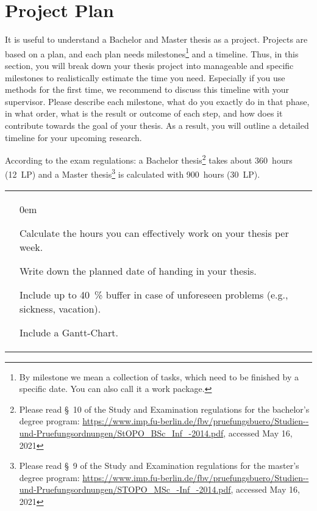 \section{Project Plan}
\label{sec:plan}

It is useful to understand a Bachelor and Master thesis as a project. Projects are based on a plan, and each plan needs milestones\footnote{By milestone we mean a collection of tasks, which need to be finished by a specific date. You can also call it a work package.} and a timeline. Thus, in this section, you will break down your thesis project into manageable and specific milestones to realistically estimate the time you need. Especially if you use methods for the first time, we recommend to discuss this timeline with your supervisor. Please describe each milestone, what do you exactly do in that phase, in what order, what is the result or outcome of each step, and how does it contribute towards the goal of your thesis. As a result, you will outline a detailed timeline for your upcoming research.

According to the exam regulations: a Bachelor thesis\footnote{Please read \S~10 of the Study and Examination regulations for the bachelor’s degree program: \url{https://www.imp.fu-berlin.de/fbv/pruefungsbuero/Studien--und-Pruefungsordnungen/StOPO_BSc_Inf_-2014.pdf}, accessed May 16, 2021} takes about 360~hours (12~LP) and a Master thesis\footnote{Please read \S~9 of the Study and Examination regulations for the master’s
degree program: \url{https://www.imp.fu-berlin.de/fbv/pruefungsbuero/Studien--und-Pruefungsordnungen/STOPO_MSc_-Inf_-2014.pdf}, accessed May 16, 2021} is calculated with 900~hours (30~LP).

\begin{table}[htbp]
\small
\colorbox{usethiscolorhere}{
\centering
\begin{tabularx}{\textwidth}{@{} r Y @{}}
	& \begin{todolist}
  \itemsep0em %
  \item Calculate the hours you can effectively work on your thesis per week.
  \item Write down the planned date of handing in your thesis.
  \item Include up to 40~\% buffer in case of unforeseen problems (e.g., sickness, vacation).
  \item Include a Gantt-Chart.
\end{todolist}\\
    
\end{tabularx}
}
\end{table}




